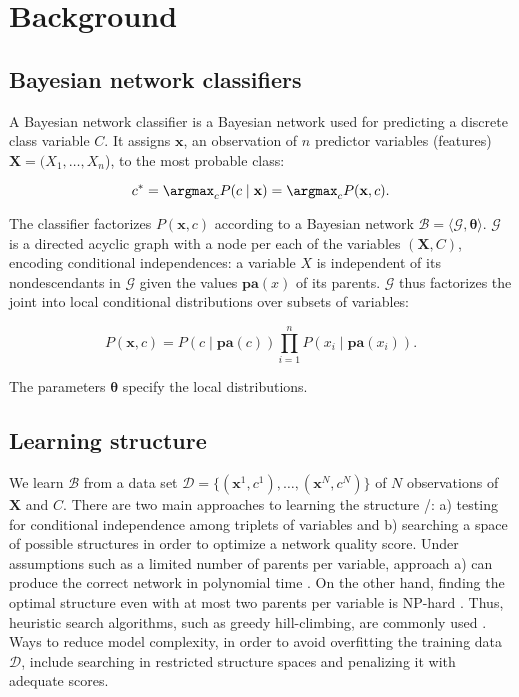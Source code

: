 \section{Background}\label{background}

\label{sec:bcground}

\subsection{Bayesian network
classifiers}\label{bayesian-network-classifiers}

\label{bayesian-networks} A Bayesian network classifier is a Bayesian
network used for predicting a discrete class variable \(C\). It assigns
\(\mathbf{x}\), an observation of \(n\) predictor variables (features)
\(\mathbf{X} = (X_1,\ldots,X_n\)), to the most probable class:

\[ c^* = \argmax_c P(c \mid \mathbf{x}) = \argmax_c P(\mathbf{x}, c).\]

\noindent The classifier factorizes \(P(\mathbf{x}, c)\) according to a
Bayesian network
\(\mathcal{B} = \langle \mathcal{G}, \boldsymbol{ \theta } \rangle\).
\(\mathcal{G}\) is a directed acyclic graph with a node per each of the
variables \((\mathbf{X}, C)\), encoding conditional independences: a
variable \(X\) is independent of its nondescendants in \(\mathcal{G}\)
given the values \(\mathbf{pa}(x)\) of its parents. \(\mathcal{G}\) thus
factorizes the joint into local conditional distributions over subsets
of variables:

\[P(\mathbf{x}, c) = P(c \mid \mathbf{pa}(c)) \prod_{i=1}^{n} P(x_i \mid \mathbf{pa}(x_i)).\]

\noindent The parameters \(\boldsymbol{ \theta }\) specify the local
distributions.

\subsection{Learning structure}\label{learning-structure}

\label{sec:bkg:learning} We learn \(\mathcal{B}\) from a data set
\(\mathcal{D} = \{ (\mathbf{x}^{1}, c^{1}), \ldots, (\mathbf{x}^{N}, c^{N}) \}\)
of \(N\) observations of \(\mathbf{X}\) and \(C\). There are two main
approaches to learning the structure \gstuc/: a) testing for conditional
independence among triplets of variables and b) searching a space of
possible structures in order to optimize a network quality score. Under
assumptions such as a limited number of parents per variable, approach
a) can produce the correct network in polynomial time
\citep{cheng-greiner02,Tsamardinos2003a}. On the other hand, finding the
optimal structure even with at most two parents per variable is NP-hard
\citep{Chickering2004}. Thus, heuristic search algorithms, such as
greedy hill-climbing, are commonly used
\citep[see, e.g.,][]{Koller2009}. Ways to reduce model complexity, in
order to avoid overfitting the training data \(\mathcal{D}\), include
searching in restricted structure spaces and penalizing it with adequate
scores.

